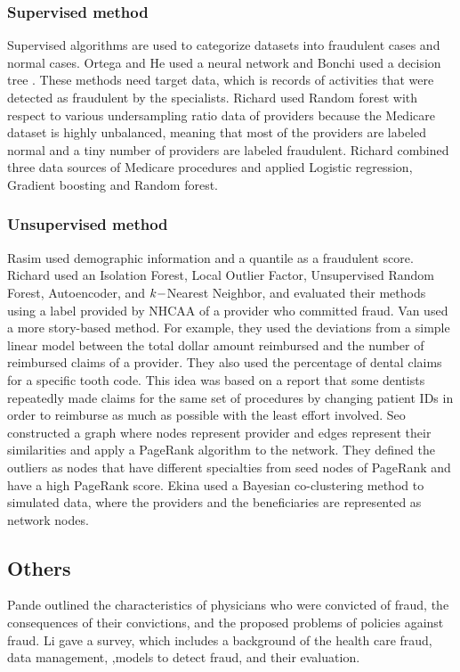 \documentclass[dvipdfmx, english]{ampmt}             %
\begin{document}
\subsubsection*{Supervised method}
Supervised algorithms are used to categorize datasets into fraudulent cases and normal cases. 
Ortega and He used a neural network\cite{Ortega, Neuralnet} and Bonchi used a decision tree \cite{Bonchi}. These methods need target data, which is records of activities that were detected as fraudulent by the specialists.
Richard\cite{RichardRF} used Random forest with respect to various undersampling ratio data of providers because the Medicare dataset is highly unbalanced, meaning that most of the providers are labeled normal and a tiny number of providers are labeled fraudulent. 
Richard\cite{RichardMultiple} combined three data sources of Medicare procedures and applied Logistic regression, Gradient boosting and Random forest. 

\subsubsection*{Unsupervised method}
Rasim\cite{TwoModels} used demographic information and a quantile as a fraudulent score.
Richard\cite{RichardUnsupervised} used an Isolation Forest, Local Outlier Factor, Unsupervised Random Forest, Autoencoder, and $k\--$Nearest Neighbor, and evaluated their methods using a label provided by NHCAA of a provider who committed fraud.
Van\cite{Van} used a more story-based method. For example, they used the deviations from a simple linear model between the total dollar amount reimbursed and the number of reimbursed claims of a provider. They also used the percentage of dental claims for a specific tooth code. This idea was based on a report that some dentists repeatedly made claims for the same set of procedures by changing patient IDs in order to reimburse as much as possible with the least effort involved. Seo\cite{Seo2017Identifying} constructed a graph where nodes represent provider and edges represent their similarities and apply a PageRank algorithm to the network. They defined the outliers as nodes that have different specialties from seed nodes of PageRank and have a high PageRank score. Ekina \cite{ekina2013application} used a Bayesian co-clustering method to simulated data, where the providers and the beneficiaries are represented as network nodes.

\subsection*{Others}
Pande\cite{Pande} outlined the characteristics of physicians who were convicted of fraud, the consequences of their convictions, and the proposed problems of policies against fraud.
Li \cite{Survey} gave a survey, which includes a background of the health care fraud, data management, 
,models to detect fraud, and their evaluation.
\end{document}
